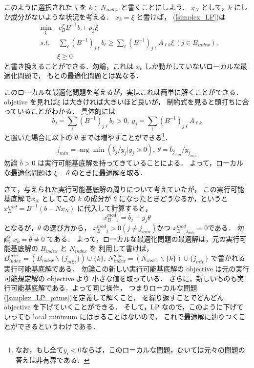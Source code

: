\documentclass[11pt, a4]{article}
\begin{document}
このように選択された $j$ を $k \in N_{index}$ と書くことにしよう．
$x_N$ として，$k$ にしか成分がないような状況を考える．
$x_k = \xi$ と書けば， (\ref{simplex_LP})は
\begin{eqnarray}
  &\min_{\xi}&\ c_B^TB^{-1}b + \rho_k\xi\nonumber\\
  &s.t.&\ \sum_{\ell}(B^{-1})_{j\ell}b_{\ell} \geq \sum_{\ell} (B^{-1})_{j\ell} A_{\ell k}\xi\ (j \in B_{index}),\nonumber\\
  &\ & \xi\geq 0
    \label{simplex_LP_prime}
\end{eqnarray}
と書き換えることができる．勿論，これは $x_k$ しか動かしていないローカルな最適化問題で，
もとの最適化問題とは異なる．

このローカルな最適化問題を考えるが，実はこれは簡単に解くことができる．
objetive を見れば$\xi$ は大きければ大きいほど良いが，
制約式を見ると頭打ちに合っていることがわかる．
具体的には
\begin{equation}
  {\bar b}_j = \sum_{\ell}(B^{-1})_{j\ell}b_{\ell} > 0,\  y_j =  \sum_{\ell} (B^{-1})_{j\ell} A_{\ell k}
  \label{b_bar}
\end{equation}
と置いた場合に以下の $\theta$ までは増やすことができる\footnote{なお，もし全て$y_i < 0$ならば，このローカルな問題，ひいては元々の問題の答えは非有界である．}．
\begin{eqnarray}
  j_{min} = \arg \min({\bar b}_j/y_j | y_j > 0),\  \theta = {\bar b}_{j_{min}}/y_{j_{min}}
  \label{i_min}
\end{eqnarray}
勿論 ${\bar b} > 0$ は実行可能基底解を持ってきていることによる．
よって，ローカルな最適化問題は $\xi = \theta$ のときに最適解を取る．

さて，与えられた実行可能基底解の周りについて考えていたが，
この実行可能基底解で$x_N$ としてこの $k$ の成分が $\theta$ になったときどうなるか，というと
$x_B^{mod} = B^{-1}(b - Nx_N)$ に代入して計算すると，
\begin{equation}
  x_B^{mod}{}_j = {\bar b}_j - y_j\theta
\end{equation}
となるが，$\theta$ の選び方から，
$x_B^{mod}{}_j > 0 (j \neq j_{min})$かつ $x_B^{mod}{}_{j_{min}} = 0$である．
勿論 $x_k = \theta \neq 0$ である．
よって，ローカルな最適化問題の最適解は，元の実行可能基底解の $B_{index}$ と $N_{index}$ を
利用して書けば，$B^{new}_{index} = (B_{index}\backslash \{j_{min}\}) \cup \{k\}$, 
$N^{new}_{index} = (N_{index}\backslash \{k\}) \cup \{j_{min}\}$ で書かれる実行可能基底解である．
勿論この新しい実行可能基底解の objective は元の実行可能規定解の objective より
小さな値を取っている．
さらに，新しいものも実行可能基底解である．よって同じ操作，
つまりローカルな問題(\ref{simplex_LP_prime})を定義して解くこと，
を繰り返すことでどんどん objective を下げていくことができる．
そして，LP なので，このように下げていっても local minimum にはまることはないので，
これで最適解に辿りつくことができるというわけである．
\end{document}

